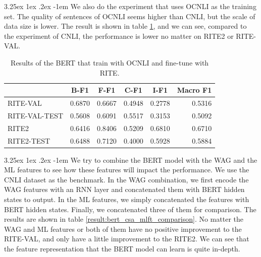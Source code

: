 \documentclass[12pt]{article}
\makeatletter
\renewcommand\paragraph{\@startsection{paragraph}{5}{\z@}%
  {3.25ex \@plus1ex \@minus.2ex}%
  {-1em}%
  {\normalfont\normalsize\bfseries}}
\makeatother
\begin{document}
\begin{CJK*}{UTF8}{bkai}
\begin{spacing}{1.77}
\paragraph{}
We also do the experiment that uses OCNLI as the training set. The quality of sentences of OCNLI seems higher than CNLI, but the scale of data size is lower. The result is shown in table \ref{result:bert_ocnli_transfer}, and we can see, compared to the experiment of CNLI, the performance is lower no matter on RITE2 or RITE-VAL.

\begin{table}[H]
  \centering
  \setlength{\extrarowheight}{-3pt}
  \begin{tabular}{|l|r|r|r|r|r|}
  \hline
   & \multicolumn{1}{c|}{B-F1} & \multicolumn{1}{c|}{F-F1} & \multicolumn{1}{c|}{C-F1} & \multicolumn{1}{c|}{I-F1} & \multicolumn{1}{c|}{Macro F1} \\ \hline
  RITE-VAL & 0.6870 & 0.6667 & 0.4948 & 0.2778 & 0.5316 \\ \hline
  RITE-VAL-TEST & 0.5608 & 0.6091 & 0.5517 & 0.3153 & 0.5092 \\ \hline
  RITE2 & 0.6416 & 0.8406 & 0.5209 & 0.6810 & 0.6710 \\ \hline
  RITE2-TEST & 0.6488 & 0.7120 & 0.4000 & 0.5928 & 0.5884 \\ \hline
  \end{tabular}
  \caption{Results of the BERT that train with OCNLI and fine-tune with RITE.}
  \label{result:bert_ocnli_transfer}
\end{table}

\paragraph{}
We try to combine the BERT model with the WAG and the ML features to see how these features will impact the performance. We use the CNLI dataset as the benchmark. In the WAG combination, we first encode the WAG features with an RNN layer and concatenated them with BERT hidden states to output. In the ML features, we simply concatenated the features with BERT hidden states. Finally, we concatenated three of them for comparison. The results are shown in table \ref{result:bert_csa_mlft_comparison}. No matter the WAG and ML features or both of them have no positive improvement to the RITE-VAL, and only have a little improvement to the RITE2. We can see that the feature representation that the BERT model can learn is quite in-depth.


\end{spacing}
\end{CJK*}
\end{document}
